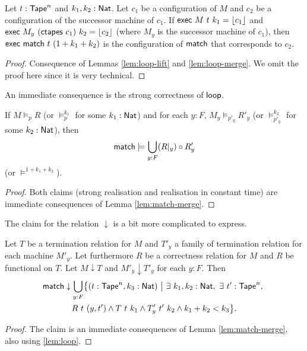 \documentclass{psartcl}
\begin{document}
\begin{lemma}
  \label{lem:match-merge}
  Let $t:\textsf{Tape}^{n}$ and $k_1, k_2:\textsf{Nat}$.
  Let $c_1$ be a configuration of $M$ and $c_2$ be a configuration of the successor machine of $c_1$.
  If $\textsf{exec}~M~t~k_1 = \left\lfloor {c_1}\right\rfloor$ and $\textsf{exec}~M_y~(\textsf{ctapes}~c_1)~k_2 = \left\lfloor {c_2}\right\rfloor$ (where $M_y$ is the successor machine of $c_1$), then
  $\textsf{exec}~\textsf{match}~t~(1+k_1+k_2)$ is the configuration of $\textsf{match}$ that corresponds to $c_2$.
\end{lemma}
\begin{proof}
  Consequence of Lemmas \ref{lem:loop-lift} and \ref{lem:loop-merge}.  We omit the proof here since it is very technical.
\end{proof}

An immediate consequence is the strong correctness of $\textsf{loop}$.

\begin{lemma}
  \label{lem:match-realise}
  If $M \vDash_p R$ (or $\vDash_p^{k_1}$ for some $k_1:\textsf{Nat}$) and for each $y:F$, $M_y \vDash_{p'_y} R'_y$ (or $\vDash_{p'_y}^{k_2}$ for some
  $k_2:\textsf{Nat}$), then
  $$\textsf{match} \models \bigcup_{y:F} (R {|}_{y}) \circ R'_y$$
  (or $\vDash^{1+k_1+k_2}$).
\end{lemma}
\begin{proof}
  Both claims (strong realisation and realisation in constant time) are immediate consequences of Lemma \ref{lem:match-merge}.
\end{proof}

The claim for the relation $\downarrow$ is a bit more complicated to express.

\begin{lemma}
  \label{lem:match-terminates}
  Let $T$ be a termination relation for $M$ and $T'_y$ a family of termination relation for each machine $M'_y$.
  Let furthermore $R$ be a correctness relation for $M$ and $R$ be functional on $T$.
  Let $M \downarrow T$ and $M'_y \downarrow T'_y$ for each $y:F$.
  Then
  \begin{multline*}
    \textsf{match} \downarrow
    \bigcup_{y:F}
    \bigl\{ (t:\textsf{Tape}^{n}, k_3 :\textsf{Nat})~\big|~\exists~k_1,k_2:\textsf{Nat},~\exists~t':\textsf{Tape}^{n},~ \\
    R~t~(y, t') \land T~t~k_1 \land T'_y~t'~k_2 \land k_1+k_2 < k_3 \bigr \}.
  \end{multline*}
\end{lemma}
\begin{proof}
  The claim is an immediate consequences of Lemma \ref{lem:match-merge}, also using \ref{lem:loop}.
\end{proof}
\end{document}

